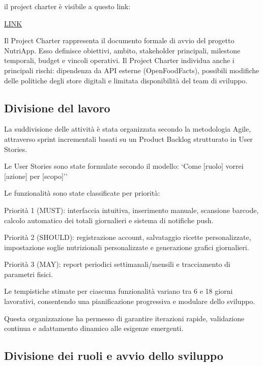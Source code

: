 \documentclass[a4paper,12pt]{article}
\begin{document}
    il project charter è visibile a questo link:

    \href{https://gitlab.com/ismailbarakat68/nutriapp/-/raw/documentazioneSprint3/Documentazione/documentazioneLatex/project_charter.pdf?ref_type=heads&inline=true}{LINK}


    Il Project Charter rappresenta il documento formale di avvio del progetto NutriApp.
    Esso definisce obiettivi, ambito, stakeholder principali, milestone temporali, budget e vincoli operativi.
    Il Project Charter individua anche i principali rischi:
    dipendenza da API esterne (OpenFoodFacts), possibili modifiche delle politiche degli store digitali e limitata disponibilità del team di sviluppo.

    \subsection{Divisione del lavoro}

    La suddivisione delle attività è stata organizzata secondo la metodologia Agile, attraverso sprint incrementali basati su un Product Backlog strutturato in User Stories.

    Le User Stories sono state formulate secondo il modello:
    `Come [ruolo] vorrei [azione] per [scopo]''

    Le funzionalità sono state classificate per priorità:

    Priorità 1 (MUST):
    interfaccia intuitiva, inserimento manuale, scansione barcode, calcolo automatico dei totali giornalieri e sistema di notifiche push.

    Priorità 2 (SHOULD):
    registrazione account, salvataggio ricette personalizzate, impostazione soglie nutrizionali personalizzate e generazione grafici giornalieri.

    Priorità 3 (MAY):
    report periodici settimanali/mensili e tracciamento di parametri fisici.

    Le tempistiche stimate per ciascuna funzionalità variano tra 6 e 18 giorni lavorativi, consentendo una pianificazione progressiva e modulare dello sviluppo.

    Questa organizzazione ha permesso di garantire iterazioni rapide, validazione continua e adattamento dinamico alle esigenze emergenti.

    \subsection{Divisione dei ruoli e avvio dello sviluppo}
\end{document}
